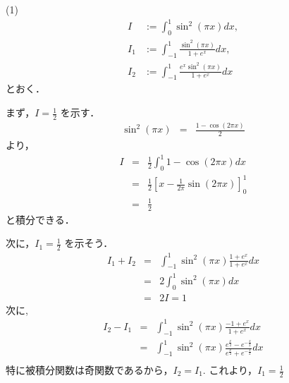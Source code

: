 \documentclass[main]{subfiles}
\begin{document}
\begin{pf}
(1) 
\begin{eqnarray*}
I &:= \int^1_0\sin^2(\pi x) dx, \\
I_1 &:= \int^1_{-1}\frac{\sin^2(\pi x)}{1+e^x}dx, \\
I_2 &:= \int^1_{-1}\frac{e^x\sin^2(\pi x)}{1+e^x}dx
\end{eqnarray*}
とおく．

まず，$I = \frac{1}{2}$ を示す．
\begin{eqnarray*}
\sin^2(\pi x) &=& \frac{1-\cos(2\pi x)}{2}
\end{eqnarray*}
より，
\begin{eqnarray*}
I &=& \frac{1}{2}\int^1_0 1-\cos(2\pi x)dx \\
	&=& \frac{1}{2}[x-\frac{1}{2\pi}\sin(2\pi x)]^1_0 \\
	&=& \frac{1}{2}
\end{eqnarray*}
と積分できる．

次に，$I_1 = \frac{1}{2}$ を示そう．
\begin{eqnarray*}
I_1 + I_2 &=& \int^1_{-1}\sin^2(\pi x) \frac{1+e^x}{1+e^x}dx \\
			&=& 2\int^1_0\sin^2(\pi x)dx \\
			&=& 2I = 1
\end{eqnarray*}
次に, 
\begin{eqnarray*}
I_2 -I_1 &=& \int^1_{-1}\sin^2(\pi x) \frac{-1+e^x}{1+e^x}dx \\
&=& \int^1_{-1}\sin^2(\pi x) 
					\frac{e^\frac{x}{2}-e^{-\frac{x}{2}}}{e^\frac{x}{2}+e^{-\frac{x}{2}}}dx \\
\end{eqnarray*}
特に被積分関数は奇関数であるから，$I_2 = I_1$. これより，$I_1 =\frac{1}{2}$


\end{pf}
\end{document}
